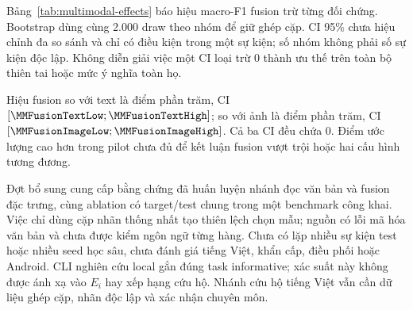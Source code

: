 Bảng~\ref{tab:multimodal-effects} báo hiệu macro-F1 fusion trừ từng đối chứng. Bootstrap dùng cùng 2.000 draw theo \MMTestGroups{} nhóm để giữ ghép cặp. CI 95\% chưa hiệu chỉnh đa so sánh và chỉ có điều kiện trong một sự kiện; số nhóm không phải số sự kiện độc lập. Không diễn giải việc một CI loại trừ 0 thành ưu thế trên toàn bộ thiên tai hoặc mức ý nghĩa toàn họ.


Hiệu fusion so với text là \MMFusionTextDelta{} điểm phần trăm, CI $[\MMFusionTextLow;\MMFusionTextHigh]$; so với ảnh là \MMFusionImageDelta{} điểm phần trăm, CI $[\MMFusionImageLow;\MMFusionImageHigh]$. Cả ba CI đều chứa 0. Điểm ước lượng cao hơn trong pilot chưa đủ để kết luận fusion vượt trội hoặc hai cấu hình tương đương.

Đợt bổ sung cung cấp bằng chứng đã huấn luyện nhánh đọc văn bản và fusion đặc trưng, cùng ablation có target/test chung trong một benchmark công khai. Việc chỉ dùng cặp nhãn thống nhất tạo thiên lệch chọn mẫu; nguồn có lỗi mã hóa văn bản và chưa được kiểm ngôn ngữ từng hàng. Chưa có lặp nhiều sự kiện test hoặc nhiều seed học sâu, chưa đánh giá tiếng Việt, khẩn cấp, điều phối hoặc Android. CLI nghiên cứu local gắn đúng task informative; xác suất này không được ánh xạ vào $E_i$ hay xếp hạng cứu hộ. Nhánh cứu hộ tiếng Việt vẫn cần dữ liệu ghép cặp, nhãn độc lập và xác nhận chuyên môn.
